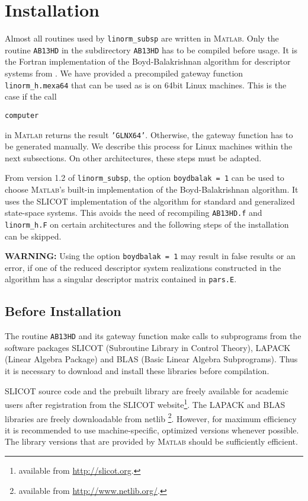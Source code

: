 \documentclass[10pt,a4paper]{article}
\begin{document}
\section{Installation}
Almost all routines used by \texttt{linorm\_subsp} are written in \textsc{Matlab}. Only the routine \texttt{AB13HD} in the subdirectory \texttt{AB13HD} has to be compiled before usage. It is the Fortran implementation of the Boyd-Balakrishnan algorithm for descriptor systems from \cite{BenSV12}. We have provided a precompiled gateway function \texttt{linorm\_h.mexa64} that can be used as is on 64bit Linux machines. This is the case if the call 
\begin{verbatim}
computer
\end{verbatim}
in \textsc{Matlab} returns the result \texttt{'GLNX64'}. Otherwise, the gateway function has to be generated manually. We describe this process for Linux machines within the next subsections. On other architectures, these steps must be adapted.

From version 1.2 of \texttt{linorm\_subsp}, the option \texttt{boydbalak = 1} can be used to choose \textsc{Matlab}'s built-in implementation of the Boyd-Balakrishnan algorithm. It uses the SLICOT implementation of the algorithm for standard and generalized state-space systems. This avoids the need of recompiling \texttt{AB13HD.f} and \texttt{linorm\_h.F} on certain architectures and the following steps of the installation can be skipped. 

\textbf{WARNING:} Using the option \texttt{boydbalak = 1} may result in false results or an error, if one of the reduced descriptor system realizations constructed in the algorithm has a singular descriptor matrix contained in \texttt{pars.E}.

\subsection{Before Installation}
The routine \texttt{AB13HD} and its gateway function make calls to subprograms from the software packages SLICOT (Subroutine Library in Control Theory), LAPACK (Linear Algebra Package) and BLAS (Basic Linear Algebra Subprograms). Thus it is necessary to download and install these libraries before compilation.

SLICOT source code and the prebuilt library are freely available for academic users after registration from the SLICOT website\footnote{available from \url{http://slicot.org}.}. The LAPACK and BLAS libraries are freely downloadable from netlib \footnote{available from \url{http://www.netlib.org/}.}. However, for maximum efficiency it is recommended to use machine-specific, optimized versions whenever possible. The library versions that are provided by \textsc{Matlab} should be sufficiently efficient.
\end{document}

